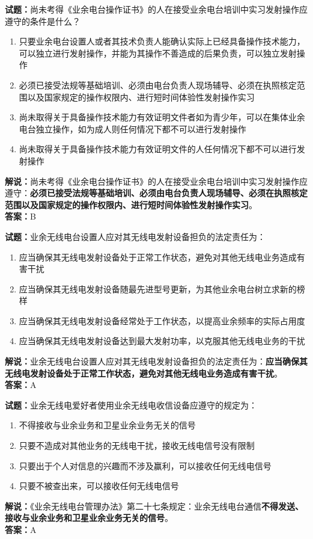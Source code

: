 \documentclass{ctexbook}
\begin{document}
\bigskip


\noindent\textbf{试题：}尚未考得《业余电台操作证书》的人在接受业余电台培训中实习发射操作应遵守的条件是什么？
\begin{enumerate}[leftmargin=3em]
	\item 只要业余电台设置人或者其技术负责人能确认实际上已经具备操作技术能力，可以独立进行发射操作，并能为其操作不善造成的后果负责，可以独立发射操作
	\item 必须已接受法规等基础培训、必须由电台负责人现场辅导、必须在执照核定范围以及国家规定的操作权限内、进行短时间体验性发射操作实习
	\item 尚未取得关于具备操作技术能力有效证明文件者如为青少年，可以在集体业余电台独立操作，如为成人则任何情况下都不可以进行发射操作
	\item 尚未取得关于具备操作技术能力有效证明文件的人任何情况下都不可以进行发射操作
\end{enumerate}
\noindent\textbf{解说：}尚未考得《业余电台操作证书》的人在接受业余电台培训中实习发射操作应遵守：\textbf{必须已接受法规等基础培训、必须由电台负责人现场辅导、必须在执照核定范围以及国家规定的操作权限内、进行短时间体验性发射操作实习}。\\\noindent\textbf{答案：}B


\bigskip


\noindent\textbf{试题：}业余无线电台设置人应对其无线电发射设备担负的法定责任为：
\begin{enumerate}[leftmargin=3em]
	\item 应当确保其无线电发射设备处于正常工作状态，避免对其他无线电业务造成有害干扰
	\item 应当确保其无线电发射设备随最先进型号更新，为其他业余电台树立求新的榜样
	\item 应当确保其无线电发射设备经常处于工作状态，以提高业余频率的实际占用度
	\item 应当确保其无线电发射设备达到最大发射功率，以克服其他无线电业务的干扰
\end{enumerate}
\noindent\textbf{解说：}业余无线电台设置人应对其无线电发射设备担负的法定责任为：\textbf{应当确保其无线电发射设备处于正常工作状态，避免对其他无线电业务造成有害干扰}。\\\noindent\textbf{答案：}A


\bigskip


\noindent\textbf{试题：}业余无线电爱好者使用业余无线电收信设备应遵守的规定为：
\begin{enumerate}[leftmargin=3em]
	\item 不得接收与业余业务和卫星业余业务无关的信号
	\item 只要不造成对其他业务的无线电干扰，接收无线电信号没有限制
	\item 只要出于个人对信息的兴趣而不涉及赢利，可以接收任何无线电信号
	\item 只要不被查出来，可以接收任何无线电信号
\end{enumerate}
\noindent\textbf{解说：}《业余无线电台管理办法》第二十七条规定：业余无线电台通信\textbf{不得发送、接收与业余业务和卫星业余业务无关的信号}。\\\noindent\textbf{答案：}A
\end{document}
